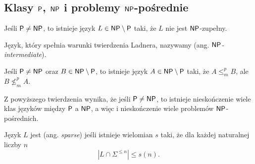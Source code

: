 \subsection{Klasy $\textsf{P}$, $\textsf{NP}$ i problemy $\textsf{NP}$-pośrednie}

\begin{theorem}[Ladnera]
    Jeśli $\textsf{P} \neq \textsf{NP}$, to istnieje język $L \in \textsf{NP} \setminus \textsf{P}$ taki, że $L$ nie jest $\textsf{NP}$-zupełny.
\end{theorem}

Język, który spełnia warunki twierdzenia Ladnera, nazywamy  (ang. \textit{$\textsf{NP}$-intermediate}).

\begin{theorem}
    Jeśli $\textsf{P} \neq \textsf{NP}$ oraz $B \in \textsf{NP} \setminus \textsf{P}$, to istnieje język $A \in \textsf{NP} \setminus \textsf{P}$ taki, że $A \leq_m^p B$, ale $B \nleq_m^p A$.
\end{theorem}

Z powyższego twierdzenia wynika, że jeśli $\textsf{P} \neq \textsf{NP}$, to istnieje nieskończenie wiele klas języków między $\textsf{P}$ a $\textsf{NP}$, a więc i nieskończenie wiele problemów $\textsf{NP}$-pośrednich.

\begin{definition}\label{d:sparse}
    Język $L$ jest  (ang. \textit{sparse}) jeśli istnieje wielomian $s$ taki, że dla każdej naturalnej liczby $n$
    \[ \left|L \cap \Sigma^{\leq n}\right| \leq s(n). \]
\end{definition}

